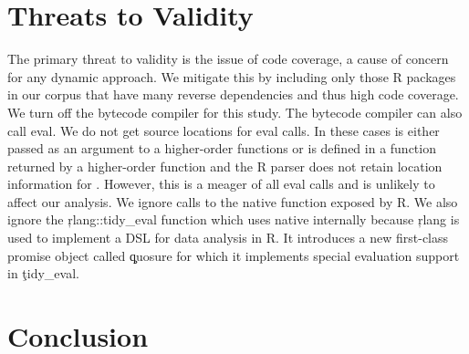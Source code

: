 \documentclass[conference]{IEEEtran}
\begin{document}
\section{Threats to Validity} The primary threat to validity is the issue of
code coverage, a cause of concern for any dynamic approach. We mitigate this by
including only those R packages in our corpus that have many reverse
dependencies and thus high code coverage. We turn off the bytecode compiler for
this study. The bytecode compiler can also call eval. We do not get source
locations for \UndefinedEvalsRnd eval calls. In these cases \eval is either
passed as an argument to a higher-order functions or is defined in a function
returned by a higher-order function and the R parser does not retain location
information for \eval. However, this is a meager \PercentUndefinedEval of all
eval calls and is unlikely to affect our analysis. We ignore calls to the native
\eval function exposed by R. We also ignore the \c{rlang::tidy_eval} function
which uses native \eval internally because \c{rlang} is used to implement a DSL
for data analysis in R. It introduces a new first-class promise object called
\c{quosure} for which it implements special evaluation support in \c{tidy_eval}.

\section{Conclusion}



\end{document}
